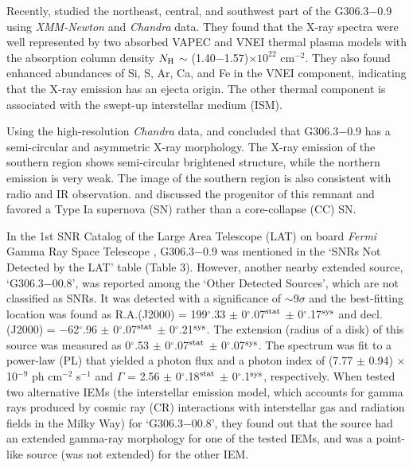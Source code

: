 \documentclass[useAMS,usenatbib]{mn2e}
\begin{document}
Recently, \citet {Co16} studied the northeast, central, and southwest part of the G306.3$-$0.9 using {\it XMM-Newton} and {\it Chandra} data. They found that the X-ray spectra were well represented by two absorbed VAPEC and VNEI thermal plasma models with the absorption column density $N_{\rm H}$ $\sim$ (1.40$-$1.57)$\times10^{22}$ cm$^{-2}$. They also found enhanced abundances of Si, S, Ar, Ca, and Fe in the VNEI component, indicating that the X-ray emission has an ejecta origin. The other thermal component is associated with the swept-up interstellar medium (ISM).

Using the  high-resolution {\it Chandra} data, \citet{Re13} and \citet{Co16} concluded that G306.3$-$0.9 has a semi-circular and asymmetric X-ray morphology. The X-ray emission of the southern region shows semi-circular brightened structure, while the northern emission is very weak. The image of the southern region is also consistent with radio and IR observation. \citet {Re13} and \citet {Co16} discussed the progenitor of this remnant and favored a Type Ia supernova (SN) rather than a core-collapse (CC) SN.

In the 1st SNR Catalog of the Large Area Telescope (LAT) on board {\it Fermi} Gamma Ray Space Telescope \citep{Ac16}, G306.3$-$0.9 was mentioned in the `SNRs Not Detected by the LAT' table (Table 3). However, another nearby extended source,  `G306.3$-$00.8', was reported among the `Other Detected Sources', which are not classified as SNRs. It was detected with a significance of $\sim$9$\sigma$ and the best-fitting location was found as R.A.(J2000) = 199$^{\circ}\!\!$.33 $\pm$ 0$^{\circ}\!\!$.07$^{\rm stat}$  $\pm$ 0$^{\circ}\!\!$.17$^{\rm sys}$ and decl.(J2000) = $-$62$^{\circ}\!\!$.96 $\pm$ 0$^{\circ}\!\!$.07$^{\rm stat}$  $\pm$ 0$^{\circ}\!\!$.21$^{\rm sys}$. The extension (radius of a disk) of this source was measured as 0$^{\circ}\!\!$.53 $\pm$ 0$^{\circ}\!\!$.07$^{\rm stat}$ $\pm$ 0$^{\circ}\!\!$.07$^{\rm sys}$. The spectrum was fit to a power-law (PL) that yielded a photon flux and a photon index of (7.77 $\pm$ 0.94) $\times$ 10$^{-9}$ ph cm$^{-2}$ s$^{-1}$ and $\Gamma$ = 2.56 $\pm$ 0$^{\circ}\!\!$.18$^{\rm stat}$ $\pm$ 0$^{\circ}\!\!$.1$^{\rm sys}$, respectively. When \citet{Ac16} tested two alternative IEMs (the interstellar emission model, which accounts for gamma rays produced by cosmic ray (CR) interactions with interstellar gas and radiation fields in the Milky Way) for `G306.3$-$00.8', they found out that the source had an extended gamma-ray morphology for one of the tested IEMs, and was a point-like source (was not extended) for the other IEM. 
\end{document}
